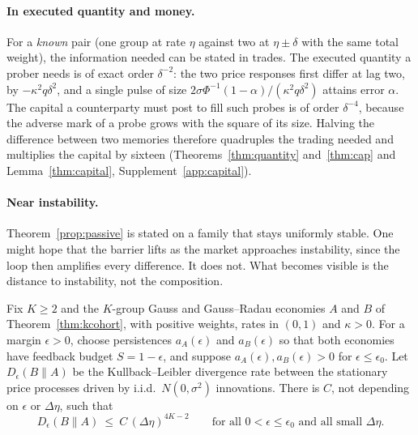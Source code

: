
\paragraph{In executed quantity and money.} For a \emph{known} pair (one group at rate $\eta$ against two at $\eta\pm\delta$ with the same total weight), the information needed can be stated in trades. The executed quantity a prober needs is of exact order $\delta^{-2}$: the two price responses first differ at lag two, by $-\kappa^2q\delta^2$, and a single pulse of size $2\sigma\Phi^{-1}(1-\alpha)/(\kappa^2q\delta^2)$ attains error $\alpha$. The capital a counterparty must post to fill such probes is of order $\delta^{-4}$, because the adverse mark of a probe grows with the square of its size. Halving the difference between two memories therefore quadruples the trading needed and multiplies the capital by sixteen (Theorems~\ref{thm:quantity} and~\ref{thm:cap} and Lemma~\ref{thm:capital}, Supplement~\ref{app:capital}).

\paragraph{Near instability.} Theorem~\ref{prop:passive} is stated on a family that stays uniformly stable. One might hope that the barrier lifts as the market approaches instability, since the loop then amplifies every difference. It does not. What becomes visible is the distance to instability, not the composition.

\begin{proposition}\label{prop:nearcrit}
Fix $K\ge2$ and the $K$-group Gauss and Gauss--Radau economies $A$ and $B$ of Theorem~\ref{thm:kcohort}, with positive weights, rates in $(0,1)$ and $\kappa>0$. For a margin $\epsilon>0$, choose persistences $a_A(\epsilon)$ and $a_B(\epsilon)$ so that both economies have feedback budget $S=1-\epsilon$, and suppose $a_A(\epsilon),a_B(\epsilon)>0$ for $\epsilon\le\epsilon_0$. Let $D_\epsilon(B\|A)$ be the Kullback--Leibler divergence rate between the stationary price processes driven by i.i.d.\ $N(0,\sigma^2)$ innovations. There is $C$, not depending on $\epsilon$ or $\Delta\eta$, such that
\[
D_\epsilon(B\|A)\ \le\ C\,(\Delta\eta)^{4K-2}\qquad\text{for all }0<\epsilon\le\epsilon_0\text{ and all small }\Delta\eta .
\]
\end{proposition}

